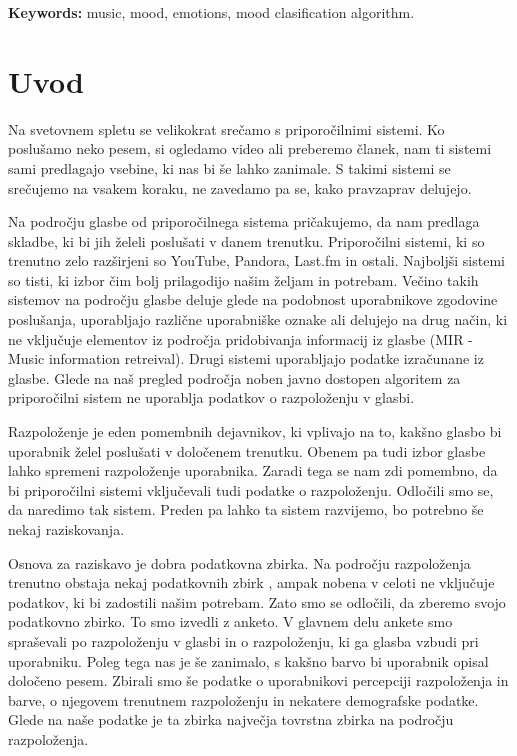 \documentclass[a4paper, 12pt]{book}
\newcommand{\tkeywordsEn}{music, mood, emotions,  mood clasification algorithm}
\newcommand{\clearemptydoublepage}{\newpage{\pagestyle{empty}\cleardoublepage}}
\begin{document}
{\bigskip

\noindent\textbf{Keywords:} \tkeywordsEn.
\clearemptydoublepage

\mainmatter
\setcounter{page}{1}
\pagestyle{fancy}


\chapter{Uvod}

Na svetovnem spletu se velikokrat srečamo s priporočilnimi sistemi. Ko poslušamo neko pesem, si ogledamo video ali preberemo članek, nam ti sistemi sami predlagajo vsebine, ki nas bi še lahko zanimale. S takimi sistemi se srečujemo na vsakem koraku, ne zavedamo pa se, kako pravzaprav delujejo. 

Na področju glasbe od priporočilnega sistema pričakujemo, da nam predlaga skladbe, ki bi jih želeli poslušati v danem trenutku. Priporočilni sistemi, ki so trenutno zelo razširjeni so YouTube, Pandora, Last.fm in ostali.  Najboljši sistemi so tisti, ki izbor čim bolj prilagodijo našim željam in potrebam. Večino takih sistemov na področju glasbe deluje glede na podobnost uporabnikove zgodovine poslušanja, uporabljajo različne uporabniške oznake ali delujejo na drug način, ki ne vključuje elementov iz področja pridobivanja informacij iz glasbe (MIR - Music information retreival). Drugi sistemi uporabljajo podatke izračunane iz glasbe. Glede na naš pregled področja noben javno dostopen algoritem za priporočilni sistem ne uporablja podatkov o razpoloženju v glasbi. 

Razpoloženje je eden pomembnih dejavnikov, ki vplivajo na to, kakšno glasbo bi uporabnik želel poslušati v določenem trenutku. Obenem pa tudi izbor glasbe lahko spremeni razpoloženje uporabnika. Zaradi tega se nam zdi pomembno, da bi priporočilni sistemi vključevali tudi podatke o razpoloženju. Odločili smo se, da naredimo tak sistem. Preden pa lahko ta sistem razvijemo, bo potrebno še nekaj raziskovanja. 

Osnova za raziskavo je dobra podatkovna zbirka. Na področju razpoloženja trenutno obstaja nekaj podatkovnih zbirk \cite{Eerola2010, schmidt2011modeling, turnbull2008semantic, schuller2010mister, panda2013multi}, ampak nobena v celoti ne vključuje podatkov, ki bi zadostili našim potrebam. Zato smo se odločili, da zberemo svojo podatkovno zbirko. To smo izvedli z anketo. V glavnem delu ankete smo spraševali po razpoloženju v glasbi in o razpoloženju, ki ga glasba vzbudi pri uporabniku. Poleg tega nas je še zanimalo, s kakšno barvo bi uporabnik opisal določeno pesem. Zbirali smo še podatke o uporabnikovi percepciji razpoloženja in barve, o njegovem trenutnem razpoloženju in nekatere demografske podatke. Glede na naše podatke je ta zbirka največja tovrstna zbirka na področju razpoloženja. 

}
\end{document}
